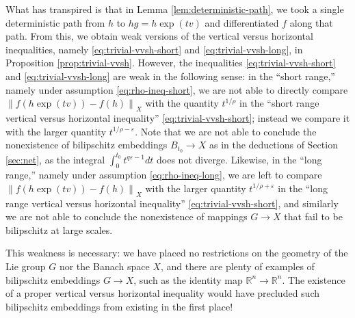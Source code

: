\documentclass[11pt,reqno]{amsart}
\newcommand{\1}{\mathbf 1}
\begin{document}
What has transpired is that in Lemma \ref{lem:deterministic-path}, we took a single deterministic path from $h$ to $hg=h\exp\left(tv\right)$ and differentiated $f$ along that path. From this, we obtain weak versions of the vertical versus horizontal inequalities, namely \eqref{eq:trivial-vvsh-short} and \eqref{eq:trivial-vvsh-long}, in Proposition \ref{prop:trivial-vvsh}. However, the inequalities \eqref{eq:trivial-vvsh-short} and \eqref{eq:trivial-vvsh-long} are weak in the following sense: in the ``short range,'' namely under assumption \eqref{eq:rho-ineq-short}, we are not able to directly compare $\left\|f\left(h\exp\left(tv\right)\right)-f\left(h\right)\right\|_X$ with the quantity $t^{1/\rho}$ in the ``short range vertical versus horizontal inequality'' \eqref{eq:trivial-vvsh-short}; instead we compare it with the larger quantity $t^{1/\rho-\varepsilon}$. Note that we are not able to conclude the nonexistence of bilipschitz embeddings $B_{t_0}\to X$ as in the deductions of Section \ref{sec:net}, as the integral $\int_0^{t_0}t^{q\varepsilon-1}dt$ does not diverge. Likewise, in the ``long range,'' namely under assumption \eqref{eq:rho-ineq-long}, we are left to compare $\left\|f\left(h\exp\left(tv\right)\right)-f\left(h\right)\right\|_X$ with the larger quantity $t^{1/\rho+\varepsilon}$ in the ``long range vertical versus horizontal inequality'' \eqref{eq:trivial-vvsh-short}, and similarly we are not able to conclude the nonexistence of mappings $G\to X$ that fail to be bilipschitz at large scales.

This weakness is necessary: we have placed no restrictions on the geometry of the Lie group $G$ nor the Banach space $X$, and there are plenty of examples of bilipschitz embeddings $G\to X$, such as the identity map $\mathbb{R}^n\to \mathbb{R}^n$. The existence of a proper vertical versus horizontal inequality would have precluded such bilipschitz embeddings from existing in the first place!
\end{document}
